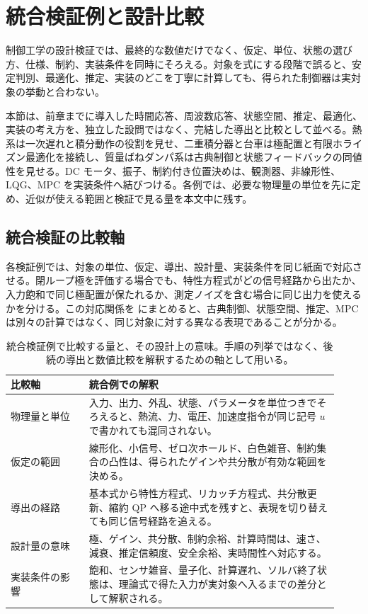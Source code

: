 \section{統合検証例と設計比較}
\label{sec:integrated-verification-examples}

制御工学の設計検証では、最終的な数値だけでなく、仮定、単位、状態の選び方、仕様、制約、実装条件を同時にそろえる。対象を式にする段階で誤ると、安定判別、最適化、推定、実装のどこを丁寧に計算しても、得られた制御器は実対象の挙動と合わない。

本節は、前章までに導入した時間応答、周波数応答、状態空間、推定、最適化、実装の考え方を、独立した設問ではなく、完結した導出と比較として並べる。熱系は一次遅れと積分動作の役割を見せ、二重積分器と台車は極配置と有限ホライズン最適化を接続し、質量ばねダンパ系は古典制御と状態フィードバックの同値性を見せる。DC モータ、振子、制約付き位置決めは、観測器、非線形性、LQG、MPC を実装条件へ結びつける。各例では、必要な物理量の単位を先に定め、近似が使える範囲と検証で見る量を本文中に残す。

\subsection{統合検証の比較軸}

各検証例では、対象の単位、仮定、導出、設計量、実装条件を同じ紙面で対応させる。閉ループ極を評価する場合でも、特性方程式がどの信号経路から出たか、入力飽和で同じ極配置が保たれるか、測定ノイズを含む場合に同じ出力を使えるかを分ける。この対応関係を  にまとめると、古典制御、状態空間、推定、MPC は別々の計算ではなく、同じ対象に対する異なる表現であることが分かる。

\begin{table}[tb]
  \centering
  \small
  \caption{統合検証例で比較する量と、その設計上の意味。手順の列挙ではなく、後続の導出と数値比較を解釈するための軸として用いる。}
  \label{tab:w08-integrated-axes}
  \begin{tabular}{@{}>{\raggedright\arraybackslash}p{0.22\linewidth}>{\raggedright\arraybackslash}p{0.70\linewidth}@{}}
    \hline
    比較軸 & 統合例での解釈 \\
    \hline
    物理量と単位 &
    入力、出力、外乱、状態、パラメータを単位つきでそろえると、熱流、力、電圧、加速度指令が同じ記号 $u$ で書かれても混同されない。 \\
    仮定の範囲 &
    線形化、小信号、ゼロ次ホールド、白色雑音、制約集合の凸性は、得られたゲインや共分散が有効な範囲を決める。 \\
    導出の経路 &
    基本式から特性方程式、リカッチ方程式、共分散更新、縮約 QP へ移る途中式を残すと、表現を切り替えても同じ信号経路を追える。 \\
    設計量の意味 &
    極、ゲイン、共分散、制約余裕、計算時間は、速さ、減衰、推定信頼度、安全余裕、実時間性へ対応する。 \\
    実装条件の影響 &
    飽和、センサ雑音、量子化、計算遅れ、ソルバ終了状態は、理論式で得た入力が実対象へ入るまでの差分として解釈される。 \\
    \hline
  \end{tabular}
\end{table}

